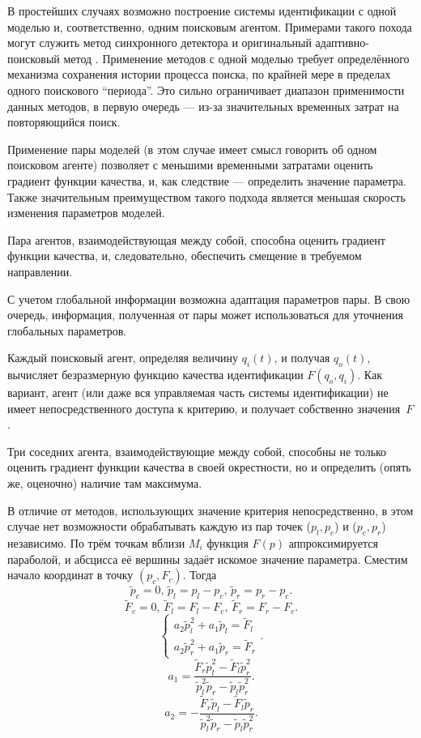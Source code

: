 В простейших случаях возможно построение системы идентификации
с одной моделью и, соответственно, одним поисковым агентом.
Примерами такого похода могут служить
метод синхронного детектора \cite{adopt_cont_sys}
и оригинальный адаптивно-поисковый метод \cite{mich_92}.
Применение методов с одной моделью требует определённого механизма
сохранения истории процесса поиска, по крайней мере в пределах
одного поискового ``периода''. Это сильно ограничивает диапазон
применимости данных методов, в первую очередь --- из-за значительных
временных затрат на повторяющийся поиск.

Применение пары моделей \cite{atu_asau3} 
(в этом случае имеет смысл говорить об одном поисковом агенте)
позволяет с меньшими временными затратами оценить градиент функции качества,
и, как следствие --- определить значение параметра. Также значительным преимуществом
такого подхода является меньшая скорость изменения параметров моделей.


Пара агентов, взаимодействующая между собой,
способна оценить градиент функции качества,
и, следовательно, обеспечить смещение в требуемом направлении.

С учетом глобальной информации возможна адаптация параметров пары.
В свою очередь, информация, полученная от пары может
использоваться для уточнения глобальных параметров.



Каждый поисковый агент, определяя величину $q_{i}(t)$, и получая $q_o(t)$,
вычисляет безразмерную функцию качества идентификации
$F(q_o,q_i)$. Как вариант, агент (или даже вся управляемая часть системы идентификации)
не имеет непосредственного доступа к критерию,
и получает собственно значения~$F$.




Три соседних агента, взаимодействующие между собой,
способны не только оценить градиент функции качества в своей окрестности,
но и определить (опять же, оценочно) наличие там максимума.

В отличие от методов, использующих значение критерия непосредственно,
в этом случае нет возможности обрабатывать
каждую из пар точек ($p_l,p_c$) и ($p_c,p_r$) независимо.
По трём точкам вблизи  $M_{i}$
функция $F(p)$ аппроксимируется параболой, и абсцисса её вершины задаёт искомое
значение параметра. Сместим начало координат в точку
$ ( p_c, F_c ) $. Тогда
%
\[
  \tilde{p}_c = 0, \,
  \tilde{p}_l = p_l - p_c, \,
  \tilde{p}_r = p_r - p_c.
\]
%
\[
  \tilde{F}_c = 0, \,
  \tilde{F}_l = F_l - F_c, \,
  \tilde{F}_r = F_r - F_c.
\]
%
\[
  \left\{
    \begin{array}{l}
      a_2 \tilde{p}_l^2 + a_1 \tilde{p}_l  = \tilde{F}_l
      \\
      a_2 \tilde{p}_r^2 + a_1 \tilde{p}_r  = \tilde{F}_r
    \end{array}
  \right. .
\]
%
\[
  a_1 = \frac{\tilde{F}_r \tilde{p}_l^2 - \tilde{F}_l \tilde{p}_r^2 }
             { \tilde{p}_l^2 \tilde{p}_r  - \tilde{p}_l \tilde{p}_r^2 }.
\]
%
\[
  a_2 = - \frac{\tilde{F}_r \tilde{p}_l - \tilde{F}_l \tilde{p}_r }
               { \tilde{p}_l^2 \tilde{p}_r  - \tilde{p}_l \tilde{p}_r^2 }.
\]

